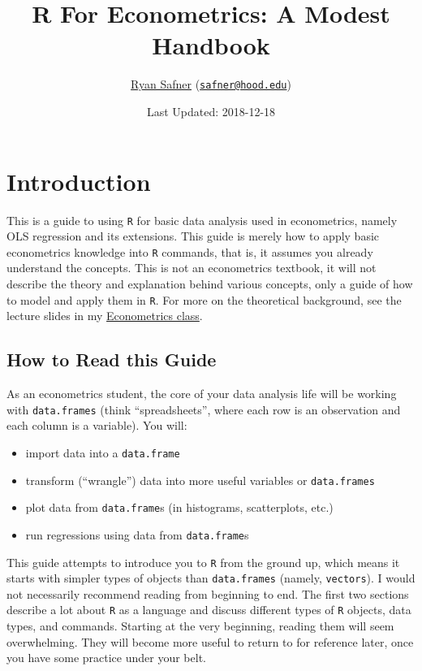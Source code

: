 \documentclass[]{book}
\title{R For Econometrics: A Modest Handbook}
\author{\href{http://ryansafner.com}{Ryan Safner}
(\href{mailto:safner@hood.edu}{\nolinkurl{safner@hood.edu}})}
\date{Last Updated: 2018-12-18}
\providecommand{\tightlist}{%
  \setlength{\itemsep}{0pt}\setlength{\parskip}{0pt}}
\theoremstyle{definition}
\theoremstyle{definition}
\theoremstyle{definition}
\theoremstyle{remark}
\begin{document}
\maketitle

{
\setcounter{tocdepth}{1}
\tableofcontents
}
\chapter*{Introduction}\label{introduction}

This is a guide to using \texttt{R} for basic data analysis used in
econometrics, namely OLS regression and its extensions. This guide is
merely how to apply basic econometrics knowledge into \texttt{R}
commands, that is, it assumes you already understand the concepts. This
is not an econometrics textbook, it will not describe the theory and
explanation behind various concepts, only a guide of how to model and
apply them in \texttt{R}. For more on the theoretical background, see
the lecture slides in my
\href{http://ryansafner.com/courses/econ480}{Econometrics class}.

\section*{How to Read this Guide}\label{how-to-read-this-guide}

As an econometrics student, the core of your data analysis life will be
working with \texttt{data.frames} (think ``spreadsheets'', where each
row is an observation and each column is a variable). You will:

\begin{itemize}
\tightlist
\item
  import data into a \texttt{data.frame}
\item
  transform (``wrangle'') data into more useful variables or
  \texttt{data.frames}
\item
  plot data from \texttt{data.frame}s (in histograms, scatterplots,
  etc.)
\item
  run regressions using data from \texttt{data.frame}s
\end{itemize}

This guide attempts to introduce you to \texttt{R} from the ground up,
which means it starts with simpler types of objects than
\texttt{data.frames} (namely, \texttt{vectors}). I would not necessarily
recommend reading from beginning to end. The first two sections describe
a lot about \texttt{R} as a language and discuss different types of
\texttt{R} objects, data types, and commands. Starting at the very
beginning, reading them will seem overwhelming. They will become more
useful to return to for reference later, once you have some practice
under your belt.
\end{document}
